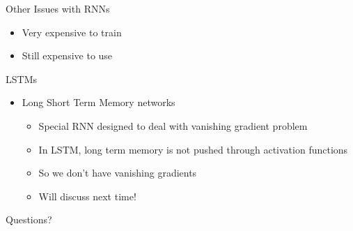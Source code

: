 \documentclass[aspectratio=169]{beamer}
\begin{document}
\begin{frame}{Other Issues with RNNs}

\begin{itemize}
	\item Very expensive to train
	\item Still expensive to use
\end{itemize}

\end{frame}
\begin{frame}{LSTMs}

\begin{itemize} 
	\item Long Short Term Memory networks
	\begin{itemize}
	\item Special RNN designed to deal with vanishing gradient problem
	\item In LSTM, long term memory is not pushed through activation functions
	\item So we don't have vanishing gradients
	\item Will discuss next time!
	\end{itemize}
\end{itemize}
\end{frame}

\begin{frame}{Questions?}
\end{frame}
\end{document}
